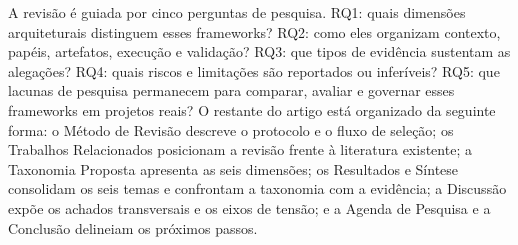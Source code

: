 A revisão é guiada por cinco perguntas de pesquisa. RQ1: quais dimensões arquiteturais distinguem esses frameworks? RQ2: como eles organizam contexto, papéis, artefatos, execução e validação? RQ3: que tipos de evidência sustentam as alegações? RQ4: quais riscos e limitações são reportados ou inferíveis? RQ5: que lacunas de pesquisa permanecem para comparar, avaliar e governar esses frameworks em projetos reais? O restante do artigo está organizado da seguinte forma: o Método de Revisão descreve o protocolo e o fluxo de seleção; os Trabalhos Relacionados posicionam a revisão frente à literatura existente; a Taxonomia Proposta apresenta as seis dimensões; os Resultados e Síntese consolidam os seis temas e confrontam a taxonomia com a evidência; a Discussão expõe os achados transversais e os eixos de tensão; e a Agenda de Pesquisa e a Conclusão delineiam os próximos passos.

